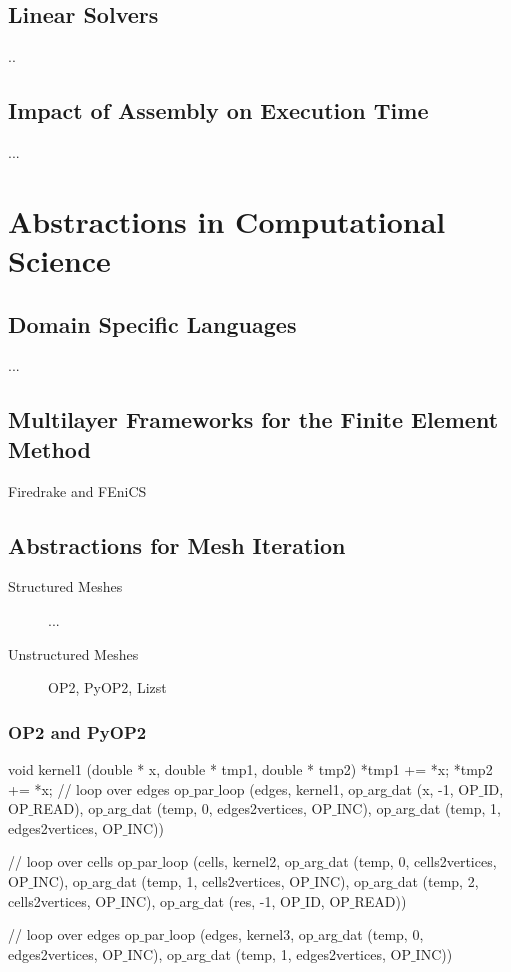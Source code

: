 \subsection{Linear Solvers}
\label{sec:bkg:linearsolvers}
..

\subsection{Impact of Assembly on Execution Time}
\label{sec:bkg:impact}
...


\section{Abstractions in Computational Science}
\label{sec:bkg:abstractions}

\subsection{Domain Specific Languages}
...

\subsection{Multilayer Frameworks for the Finite Element Method}
\label{sec:bkg:firedrake}
Firedrake and FEniCS

\subsection{Abstractions for Mesh Iteration}
\label{sec:bkg:meshiteration}
\begin{description}
\item[Structured Meshes] ...
\item[Unstructured Meshes] OP2, PyOP2, Lizst
\end{description}

\subsubsection{OP2 and PyOP2}
\label{sec:bkg:op2}

\begin{algorithm}
\scriptsize\ttfamily
{}

void kernel1 (double * x, double * tmp1, double * tmp2) {
  *tmp1 += *x;
  *tmp2 += *x;
}
// loop over edges
op$\_$par$\_$loop (edges, kernel1,
  op$\_$arg$\_$dat (x, -1, OP$\_$ID, OP$\_$READ),
  op$\_$arg$\_$dat (temp, 0, edges2vertices, OP$\_$INC),
  op$\_$arg$\_$dat (temp, 1, edges2vertices, OP$\_$INC))

// loop over cells
op$\_$par$\_$loop (cells, kernel2,
  op$\_$arg$\_$dat (temp, 0, cells2vertices, OP$\_$INC),
  op$\_$arg$\_$dat (temp, 1, cells2vertices, OP$\_$INC),
  op$\_$arg$\_$dat (temp, 2, cells2vertices, OP$\_$INC),
  op$\_$arg$\_$dat (res, -1, OP$\_$ID, OP$\_$READ))

// loop over edges
op$\_$par$\_$loop (edges, kernel3,
  op$\_$arg$\_$dat (temp, 0, edges2vertices, OP$\_$INC),
  op$\_$arg$\_$dat (temp, 1, edges2vertices, OP$\_$INC))

\caption{...}
\label{code:op2program}
\end{algorithm}

